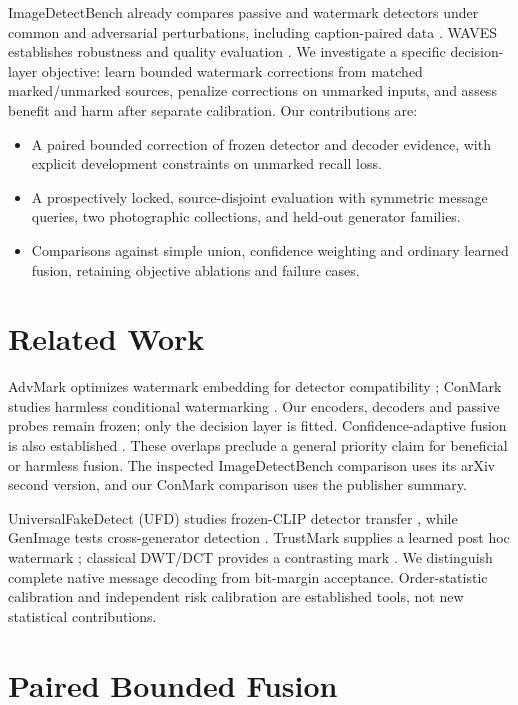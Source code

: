 \documentclass[conference]{IEEEtran}
\begin{document}
ImageDetectBench already compares passive and watermark detectors under common
and adversarial perturbations, including caption-paired data \cite{imagedetectbench}.
WAVES establishes robustness and quality evaluation \cite{waves}.
We investigate a specific decision-layer objective: learn bounded watermark
corrections from matched marked/unmarked sources, penalize corrections on unmarked
inputs, and assess benefit and harm after separate calibration.
Our contributions are:
\begin{itemize}
\item A paired bounded correction of frozen detector and decoder evidence,
with explicit development constraints on unmarked recall loss.
\item A prospectively locked, source-disjoint evaluation with symmetric message
queries, two photographic collections, and held-out generator families.
\item Comparisons against simple union, confidence weighting and ordinary learned
fusion, retaining objective ablations and failure cases.
\end{itemize}

\section{Related Work}
AdvMark optimizes watermark embedding for detector compatibility
\cite{advmark}; ConMark studies harmless conditional watermarking \cite{conmark}.
Our encoders, decoders and passive probes remain frozen; only the decision layer
is fitted. Confidence-adaptive fusion is also established \cite{deepfakebuster}.
These overlaps preclude a general priority claim for beneficial or harmless
fusion. The inspected ImageDetectBench comparison uses its arXiv second version,
and our ConMark comparison uses the publisher summary.

UniversalFakeDetect (UFD) studies frozen-CLIP detector transfer \cite{univfd},
while GenImage tests cross-generator detection \cite{genimage}.
TrustMark supplies a learned post hoc watermark \cite{trustmark}; classical
DWT/DCT provides a contrasting mark \cite{alhaj}. We distinguish complete native
message decoding from bit-margin acceptance. Order-statistic calibration
\cite{conformal} and independent risk calibration \cite{ltt} are established
tools, not new statistical contributions.

\section{Paired Bounded Fusion}
\end{document}
